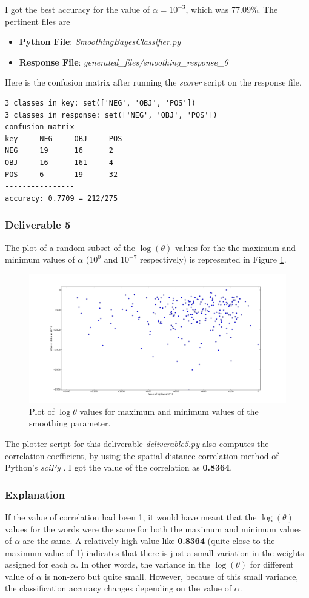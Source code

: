 \documentclass[10pt, letter]{article}
\begin{document}
I got the best accuracy for the value of $\alpha = 10^{-3}$, which was 77.09\%.
The pertinent files are
\begin{itemize}
	\item \textbf{Python File}: \textit{SmoothingBayesClassifier.py}
	\item \textbf{Response File}: \textit{generated\_files/smoothing\_response\_6}
\end{itemize}
Here is the confusion matrix after running the \textit{scorer} script on the response file.
\begin{verbatim}
3 classes in key: set(['NEG', 'OBJ', 'POS'])
3 classes in response: set(['NEG', 'OBJ', 'POS'])
confusion matrix
key     NEG     OBJ     POS
NEG     19      16      2
OBJ     16      161     4
POS     6       19      32
----------------
accuracy: 0.7709 = 212/275
\end{verbatim}

\subsubsection*{Deliverable 5}
The plot of a random subset of the $\log(\theta)$ values for the the maximum and minimum values of $\alpha$ ($10^0$ and $10^{-7}$ respectively) is represented in Figure \ref{del5}.
\begin{figure}
  \centering
    \includegraphics[scale=0.25]{images/deliverable_5}
    \caption{Plot of $\log{\theta}$ values for maximum and minimum values of the smoothing parameter.}
  \label{del5}
\end{figure}

The plotter script for this deliverable \textit{deliverable5.py} also computes the correlation coefficient, by using the spatial distance correlation method of Python's \textit{sciPy} \cite{scipy}. I got the value of the correlation as \textbf{0.8364}.
\subsubsection*{Explanation}
If the value of correlation had been 1, it would have meant that the $\log(\theta)$ values for the words were the same for both the maximum and minimum values of $\alpha$ are the same. A relatively high value like \textbf{0.8364} (quite close to the maximum value of 1) indicates that there is just a small variation in the weights assigned for each $\alpha$. In other words, the variance in the $\log(\theta)$ for different value of $\alpha$ is non-zero but quite small. However,  because of this small variance, the classification accuracy changes depending on the value of $\alpha$.
\end{document}
